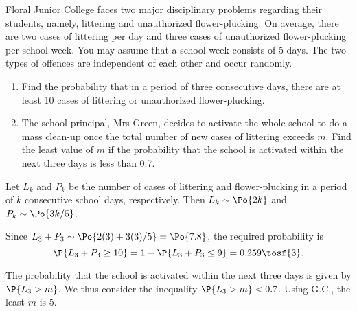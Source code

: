 \begin{problem}
    Floral Junior College faces two major disciplinary problems regarding their students, namely, littering and unauthorized flower-plucking. On average, there are two cases of littering per day and three cases of unauthorized flower-plucking per school week. You may assume that a school week consists of 5 days. The two types of offences are independent of each other and occur randomly.

    \begin{enumerate}
        \item Find the probability that in a period of three consecutive days, there are at least 10 cases of littering or unauthorized flower-plucking.
        \item The school principal, Mrs Green, decides to activate the whole school to do a mass clean-up once the total number of new cases of littering exceeds $m$. Find the least value of $m$ if the probability that the school is activated within the next three days is less than 0.7.
    \end{enumerate}
\end{problem}
\begin{solution}
    Let $L_k$ and $P_k$ be the number of cases of littering and flower-plucking in a period of $k$ consecutive school days, respectively. Then $L_k \sim \Po{2k}$ and $P_k \sim \Po{3k/5}$.

    \begin{ppart}
        Since $L_3 + P_3 \sim \Po{2(3) + 3(3)/5} = \Po{7.8}$, the required probability is \[\P{L_3 + P_3 \geq 10} = 1 - \P{L_3 + P_3 \leq 9} = 0.259 \tosf{3}.\]
    \end{ppart}
    \begin{ppart}
        The probability that the school is activated within the next three days is given by $\P{L_3 > m}$. We thus consider the inequality $\P{L_3 > m} < 0.7$. Using G.C., the least $m$ is 5.
    \end{ppart}
\end{solution}


